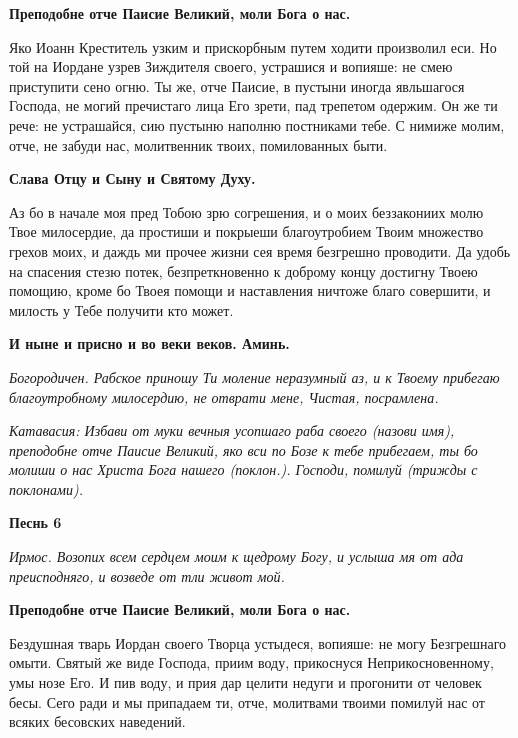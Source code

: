 \bfseries Преподобне отче Паисие Великий, моли Бога о нас. \normalfont{}




Яко Иоанн Креститель узким и прискорбным путем ходити произволил еси. Но той на Иордане узрев Зиждителя своего, устрашися и вопияше: не смею приступити сено огню. Ты же, отче Паисие, в пустыни иногда явльшагося Господа, не могий пречистаго лица Его зрети, пад трепетом одержим. Он же ти рече: не устрашайся, сию пустыню наполню постниками тебе. С нимиже молим, отче, не забуди нас, молитвенник твоих, помилованных быти. 




\bfseries Слава Отцу и Сыну и Святому Духу.\normalfont{} 




Аз бо в начале моя пред Тобою зрю согрешения, и о моих беззакониих молю Твое милосердие, да простиши и покрыеши благоутробием Твоим множество грехов моих, и даждь ми прочее жизни сея время безгрешно проводити. Да удобь на спасения стезю потек, безпреткновенно к доброму концу достигну Твоею помощию, кроме бо Твоея помощи и наставления ничтоже благо совершити, и милость у Тебе получити кто может. 




\bfseries И ныне и присно и во веки веков. Аминь.\normalfont{} 




\itshape Богородичен.\normalfont{} Рабское приношу Ти моление неразумный аз, и к Твоему прибегаю благоутробному милосердию, не отврати мене, Чистая, посрамлена. 




\itshape Катавасия:\normalfont{} Избави от муки вечныя усопшаго раба своего (\itshape назови имя\normalfont{}), преподобне отче Паисие Великий, яко вси по Бозе к тебе прибегаем, ты бо молиши о нас Христа Бога нашего (\itshape поклон.\normalfont{}). Господи, помилуй (\itshape трижды с поклонами\normalfont{}). 




\bfseries Песнь 6\normalfont{} 




\itshape Ирмос.\normalfont{} Возопих всем сердцем моим к щедрому Богу, и услыша мя от ада преисподняго, и возведе от тли живот мой. 




\bfseries Преподобне отче Паисие Великий, моли Бога о нас.\normalfont{} 




Бездушная тварь Иордан своего Творца устыдеся, вопияше: не могу Безгрешнаго омыти. Святый же виде Господа, приим воду, прикоснуся Неприкосновенному, умы нозе Его. И пив воду, и прия дар целити недуги и прогонити от человек бесы. Сего ради и мы припадаем ти, отче, молитвами твоими помилуй нас от всяких бесовских наведений. 




